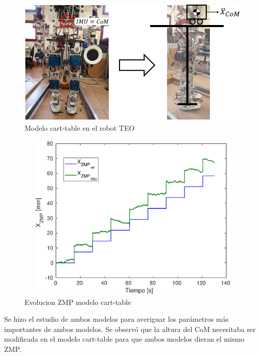 \begin{figure}[H]
\centering
\includegraphics[scale=0.6]{imagenes/apartado_5/515_cart_table_robot}
\caption{Modelo cart-table en el robot TEO}
\label{figura515}
\end{figure}


\begin{figure}[H]
\centering
\includegraphics[width=13cm, height=8cm]{imagenes/apartado_5/516_evol_cart_table}
\caption{Evolucion ZMP modelo cart-table}
\label{figura516}
\end{figure}

Se hizo el estudio de ambos modelos para averiguar los parámetros más importantes de ambos modelos. Se observó que la altura del CoM necesitaba ser modificada en el modelo cart-table para que ambos modelos dieran el mismo ZMP.

